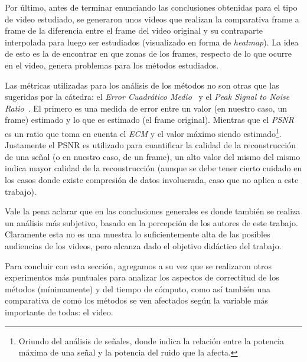 \par Por \'ultimo, antes de terminar enunciando las conclusiones obtenidas para
el tipo de video estudiado, se generaron unos videos que realizan la
comparativa frame a frame de la diferencia entre el frame del video original y
su contraparte interpolada para luego ser estudiados (visualizado en forma de
\emph{heatmap}). La idea de esto es la de encontrar en que zonas de los frames,
respecto de lo que ocurre en el video, genera problemas para los m\'etodos
estudiados.

\par Las m\'etricas utilizadas para los an\'alisis de los m\'etodos no son otras
que las sugeridas por la c\'atedra: el \emph{Error Cuadr\'atico
Medio}~\cite{mse} y el \emph{Peak Signal to Noise Ratio}~\cite{psnr}. El primero
es una medida de error entre un valor (en nuestro caso, un frame) estimado y lo
que es estimado (el frame original). Mientras que el \emph{PSNR} es un ratio
que toma en cuenta el \emph{ECM} y el valor m\'aximo siendo
estimado\footnote{Oriundo del an\'alisis de se\~nales, donde indica la
relaci\'on entre la potencia m\'axima de una se\~nal y la potencia del ruido
que la afecta.}. Justamente el PSNR es utilizado para cuantificar la calidad de
la reconstrucci\'on de una se\~nal (o en nuestro caso, de un frame), un alto
valor del mismo del mismo indica mayor calidad de la reconstrucci\'on (aunque
se debe tener cierto cuidado en los casos donde existe compresi\'on de datos
involucrada, caso que no aplica a este trabajo).

\par Vale la pena aclarar que en las conclusiones generales es donde tambi\'en
se realiza un an\'alisis m\'as subjetivo, basado en la percepci\'on de los
autores de este trabajo. Claramente esta no es una muestra lo suficientemente
alta de las posibles audiencias de los videos, pero alcanza dado el objetivo
did\'actico del trabajo.

\par Para concluir con esta secci\'on, agregamos a su vez que se realizaron
otros experimentos m\'as puntuales para analizar los aspectos de correctitud de
los m\'etodos (m\'inimamente) y del tiempo de c\'omputo, como as\'i tambi\'en
una comparativa de como los m\'etodos se ven afectados seg\'un la variable
m\'as importante de todas: el video.
